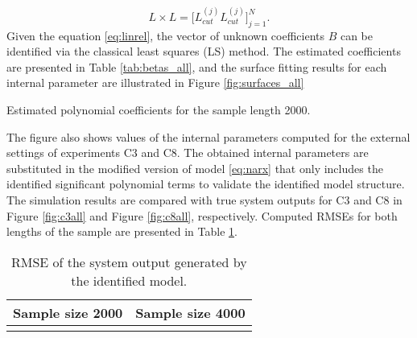 \documentclass[a4paper,11pt,twoside]{article}
\def\dataset{C}
\theoremstyle{mytheoremstyle}
\begin{document}
\begin{equation*}
L\times L = \Big[ L_{cut}^{(j)} L_{cut}^{(j)}\Big]^{N}_{j=1}.
\end{equation*}
Given the equation \eqref{eq:linrel}, the vector of unknown coefficients $B$ can be identified via the classical least squares (LS) method. The estimated coefficients are presented in Table \ref{tab:betas_all}, and the surface fitting results for each internal parameter are illustrated in Figure \ref{fig:surfaces_all} 
\begin{table}[!h]
	\centering
	\caption{Estimated polynomial coefficients for the sample length 2000.}\label{tab:betas_all}
	\small
	
\end{table}
The figure also shows values of the internal parameters computed for the external settings of experiments \dataset3 and \dataset8. The obtained internal parameters are substituted in the modified version of model \eqref{eq:narx} that only includes the identified significant  polynomial terms to validate the identified model structure. The simulation results are compared with true system outputs for \dataset3 and \dataset8 in Figure \ref{fig:c3all} and Figure \ref{fig:c8all}, respectively. Computed RMSEs for both lengths of the sample are presented in Table \ref{tab:RMSEs}.
\begin{table}[!h]
	\centering
	\caption{RMSE of the system output generated by the identified model.}\label{tab:RMSEs}
		\begin{tabular}{cc}
			Sample size 2000 & Sample size 4000 \\
			\hline	
			\begin{minipage}{2in} \end{minipage}& 
			\begin{minipage}{2in} \vspace{0.5cm}\end{minipage}\\
			\hline
		\end{tabular}
\end{table}
\end{document}
